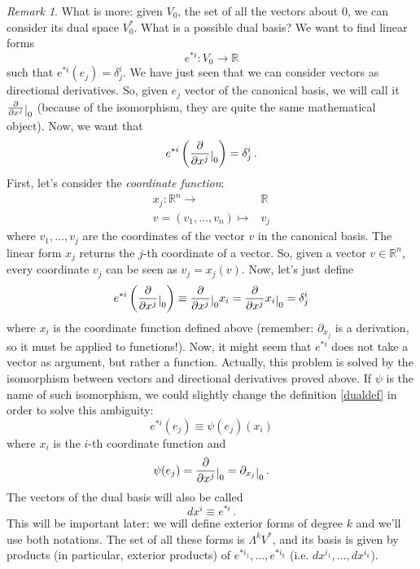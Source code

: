 \documentclass[a4paper,11pt,titlepage, article, oneside]{memoir}
\numberwithin{equation}{section}
\theoremstyle{definition}
\theoremstyle{remark}
\newtheorem{remark}[theorem]{Remark}
\newcommand{\rfield}{\mathbb{R}}
\newcommand{\restrict}[2]{{#1}\raisebox{-.5ex}{$|$}_{#2}}
\begin{document}
\begin{remarkbox}
\begin{remark}
What is more: given $V_0$, the set of all the vectors about $0$, we can consider its dual space $V_0^*$. %
What is a possible dual basis?  We want to find linear forms $$e^{*i} \colon V_0 \rightarrow \rfield$$ such that $e^{*i}(e_j) = \delta_j^i$.
We have just seen that we can consider vectors as directional derivatives. So, given $e_j$ vector of the canonical basis, we will call it $\restrict{\frac{\partial}{\partial x^j}}{0}$ (because of the isomorphism, they are quite the same mathematical object).
Now, we want that
\begin{equation} \label{dualbasisdelta}
e^{*i}\left( \restrict{\frac{\partial}{\partial x^j}}{0} \right) = \delta_j^i \, .
\end{equation}
First, let's consider the \textit{coordinate function}:
\begin{align} \label{coofunc}
x_j \colon \rfield^n \rightarrow & \rfield \\
v=(v_1, \ldots, v_n) \mapsto &v_j \nonumber
\end{align}
where $v_1, \ldots, v_j$ are the coordinates of the vector $v$ in the canonical basis. The linear form $x_j$ returns the $j$-th coordinate of a vector. So, given a vector $v \in \rfield^n$, every coordinate $v_j$ can be seen as $v_j = x_j(v)$.
Now, let's just define
\begin{equation} \label{dualdef}
e^{*i}\left( \restrict{\frac{\partial}{\partial x^j}}{0} \right) \equiv \restrict{\frac{\partial}{\partial x^j}}{0} x_i =\restrict{\frac{\partial}{\partial x^j} x_i}{0} = \delta_j^i
\end{equation}
where $x_i$ is the coordinate function defined above (remember: $\partial_{x_j}$ is a derivation, so it must be applied to functions!). Now, it might seem that $e^{*i}$ does not take a vector as argument, but rather a function. Actually, this problem is solved by the isomorphism between vectors and directional derivatives proved above. If $\psi$ is the name of such isomorphism, we could slightly change the definition \eqref{dualdef} in order to solve this ambiguity:
\begin{equation}
e^{*i}(e_j) \equiv \psi(e_j) (x_i)
\end{equation}
where $x_i$ is the $i$-th coordinate function and
\begin{equation}
\psi(e_j) = \restrict{\frac{\partial}{\partial x^j}}{0} = \restrict{\partial_{x_j}}{0} \, .
\end{equation}
The vectors of the dual basis will also be called
\begin{equation}
  dx^i \equiv e^{*i} \, .
\end{equation}
This will be important later: we will define exterior forms of degree $k$ and we'll use both notations. The set of all these forms is $\Lambda^k V^*$, and its basis is given by products (in particular, exterior products) of $e^{*i_1}, \ldots, e^{*i_k}$ (i.e. $dx^{i_1}, \ldots, dx^{i_k}$).
\end{remark}\end{remarkbox}
$ $ \newline
$ $
\end{document}
